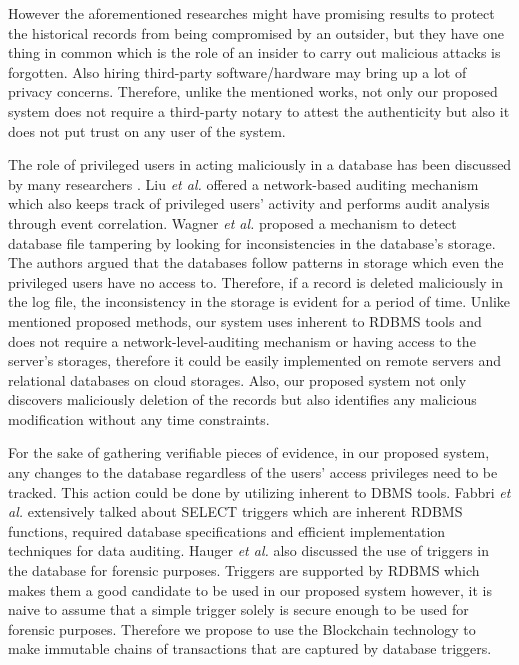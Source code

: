         However the aforementioned researches might have promising results to
protect the historical records from being compromised by an outsider, but they
have one thing in common which is the role of an insider to carry out malicious
attacks is forgotten. Also hiring third-party software/hardware may bring up a
lot of privacy concerns. Therefore, unlike the mentioned works, not only our
proposed system does not require a third-party notary to attest the authenticity
but also it does not put trust on any user of the system.

        The role of privileged users in acting maliciously in a database has
been discussed by many researchers \cite{crosby2009tamper-evident}
\cite{wagner2018detect}. Liu {\it et al.} offered a network-based auditing
mechanism which also keeps track of privileged users' activity and performs
audit analysis through event correlation. Wagner {\it et al.}
\cite{wanger2017carving} proposed a mechanism to detect database file tampering
by looking for inconsistencies in the database's storage. The authors argued
that the databases follow patterns in storage which even the privileged users
have no access to. Therefore, if a record is deleted maliciously in the log
file, the inconsistency in the storage is evident for a period of time. Unlike
mentioned proposed methods, our system uses inherent to RDBMS tools and does not
require a network-level-auditing mechanism or having access to the server's
storages, therefore it could be easily implemented on remote servers and
relational databases on cloud storages. Also, our proposed system not only
discovers maliciously deletion of the records but also identifies any malicious
modification without any time constraints.

        For the sake of gathering verifiable pieces of evidence, in our proposed
system, any changes to the database regardless of the users' access privileges
need to be tracked. This action could be done by utilizing inherent to DBMS
tools. Fabbri {\it et al.} \cite{fabbri2013select} extensively talked about
SELECT triggers which are inherent RDBMS functions, required database
specifications and efficient implementation techniques for data auditing. Hauger
{\it et al.}\cite{hauger2014information} also discussed the use of triggers in
the database for forensic purposes. Triggers are supported by RDBMS which makes
them a good candidate to be used in our proposed system however, it is naive to
assume that a simple trigger solely is secure enough to be used for forensic
purposes. Therefore we propose to use the Blockchain technology to make
immutable chains of transactions that are captured by database triggers.

